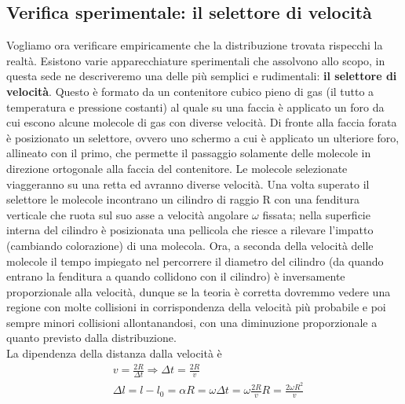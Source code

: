 \documentclass[
10pt, %
a4paper, %
oneside, %
headinclude,footinclude, %
BCOR5mm, %
]{scrartcl}
\begin{document}
\subsection{Verifica sperimentale: il selettore di velocità}
Vogliamo ora verificare empiricamente che la distribuzione trovata rispecchi la realtà. Esistono varie apparecchiature sperimentali che assolvono allo scopo, in questa sede ne descriveremo una delle più semplici e rudimentali: \textbf{il selettore di velocità}. Questo è formato da un contenitore cubico pieno di gas (il tutto a temperatura e pressione costanti) al quale su una faccia è applicato un foro da cui escono alcune molecole di gas con diverse velocità. Di fronte alla faccia forata è posizionato un selettore, ovvero uno schermo a cui è applicato un ulteriore foro, allineato con il primo, che permette il passaggio solamente delle molecole in direzione ortogonale alla faccia del contenitore. Le molecole selezionate viaggeranno su una retta ed avranno diverse velocità. Una volta superato il selettore le molecole incontrano un cilindro di raggio R con una fenditura verticale che ruota sul suo asse a velocità angolare $\omega$ fissata; nella superficie interna del cilindro è posizionata una pellicola che riesce a rilevare l'impatto (cambiando colorazione) di una molecola. Ora, a seconda della velocità delle molecole il tempo impiegato nel percorrere il diametro del cilindro (da quando entrano la fenditura a quando collidono con il cilindro) è inversamente proporzionale alla velocità, dunque se la teoria è corretta dovremmo vedere una regione con molte collisioni in corrispondenza della velocità più probabile e poi sempre minori collisioni allontanandosi, con una diminuzione proporzionale a quanto previsto dalla distribuzione.\\
La dipendenza della distanza dalla velocità è
\begin{align*} 
	&v = \frac{2R}{\Delta t} \Rightarrow \Delta t = \frac{2R}{v}\\
	&\Delta l = l-l_0 = \alpha R = \omega \Delta t=\omega \frac{2R}{v}R = \frac{2 \omega R^2}{v} 
\end{align*} 
\end{document}
